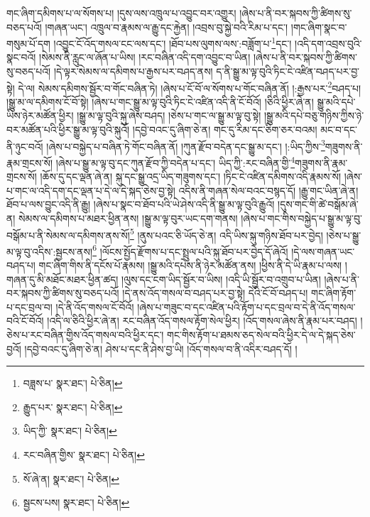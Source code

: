 གང་ཞིག་དམིགས་པ་ལ་སོགས་པ། །དུས་ལས་འཁྲུལ་པ་འབྱུང་བར་འགྱུར། །ཞེས་པ་ནི་བར་སྐབས་ཀྱི་ཚིགས་སུ་བཅད་པའོ། །གཞན་ཡང་། འཁྲུལ་བ་རྣམས་ལ་རྒྱུ་དང་རྐྱེན། །འབྲས་བུ་སྐྱེ་བའི་རིམ་པ་དང་། །གང་ཞིག་སྣང་བ་གསུམ་པོ་དག །འབྱུང་ངོ་འོད་གསལ་ངང་ལས་དང་། །ཐོབ་པས་ལུགས་ལས་:བཟློག་པ་\footnote{བཟླས་པ་  སྣར་ཐང་།  པེ་ཅིན། }དང་། །འདི་དག་འབྲས་བུའི་སྣང་བའོ། །སེམས་ནི་རླུང་ལ་ཞོན་པ་ཡིས། །རང་བཞིན་འདི་དག་འབྱུང་བ་ཡིན། །ཞེས་པ་ནི་བར་སྐབས་ཀྱི་ཚིགས་སུ་བཅད་པའོ། །དེ་ལྟར་སེམས་ལ་དམིགས་པ་རྒྱས་པར་བཤད་ནས། ད་ནི་སྒྱུ་མ་ལྟ་བུའི་ཏིང་ངེ་འཛིན་བཤད་པར་བྱ་སྟེ། དེ་ལ། སེམས་དམིགས་སྦྱོར་བ་གོང་བཞིན་ཏེ། །ཞེས་པ་ངོ་བོ་ལ་སོགས་པ་གོང་བཞིན་ནོ། །:རྒྱས་པར་\footnote{རྒྱུད་པར་  སྣར་ཐང་།  པེ་ཅིན། }བཤད་པ། །སྒྱུ་མ་ལ་དམིགས་ངོ་བོ་སྟེ། །ཞེས་པ་གང་སྒྱུ་མ་ལྟ་བུའི་ཏིང་ངེ་འཛིན་འདི་ནི་ངོ་བོའོ། །ཅིའི་ཕྱིར་ཞེ་ན། སྒྱུ་མའི་དཔེ་ཡིས་ཉེར་མཚོན་ཕྱིར། །སྒྱུ་མ་ལྟ་བུའི་སྐུ་ཞེས་བཤད། །ཅེས་པ་གང་ལ་སྒྱུ་མ་ལྟ་བུ་སྟེ། །སྒྱུ་མའི་དཔེ་བཅུ་གཉིས་ཀྱིས་ཉེ་བར་མཚོན་པའི་ཕྱིར་སྒྱུ་མ་ལྟ་བུའི་སྐུའོ། །དབྱེ་བའང་དུ་ཞིག་ཅེ་ན། གང་དུ་རིམ་དང་ཅིག་ཅར་བའམ། མང་བ་དང་ནི་ཉུང་བའོ། །ཞེས་པ་བསྐྱེད་པ་བཞིན་ཏེ་གོང་བཞིན་ནོ། །ཀུན་རྫོབ་བདེན་དང་སྒྱུ་མ་དང་། །:ཡིད་ཀྱིས་\footnote{ཡིད་ཀྱི་  སྣར་ཐང་།  པེ་ཅིན། }གཟུགས་ནི་རྣམ་གྲངས་སོ། །ཞེས་པ་སྒྱུ་མ་ལྟ་བུ་དང་ཀུན་རྫོབ་ཀྱི་བདེན་པ་དང་། ཡིད་ཀྱི་:རང་བཞིན་གྱི་\footnote{རང་བཞིན་གྱིས་  སྣར་ཐང་།  པེ་ཅིན། }གཟུགས་ནི་རྣམ་གྲངས་སོ། །ཆོས་དུ་དང་ལྡན་ཞེ་ན། སྐུ་དང་སྒྱུ་འདྲ་ཡིད་གཟུགས་དང་། །ཏིང་ངེ་འཛིན་དམིགས་འདི་རྣམས་སོ། །ཞེས་པ་གང་ལ་འདི་དག་དང་ལྡན་པ་དེ་ལ་དེ་སྐད་ཅེས་བྱ་སྟེ། འདིས་ནི་གཞན་སེལ་བའང་བསྙད་དོ། །རྒྱུ་གང་ཡིན་ཞེ་ན། ཐོབ་པ་ལས་བྱུང་འདི་ནི་རྒྱུ། །ཞེས་པ་སྣང་བ་ཐོབ་པའི་ཡེ་ཤེས་འདི་ནི་སྒྱུ་མ་ལྟ་བུའི་རྒྱུའོ། །དུས་གང་གི་ཚེ་བསྒོམ་ཞེ་ན། སེམས་ལ་དམིགས་པ་མཐར་ཕྱིན་ནས། །སྒྱུ་མ་ལྟ་བུར་ཡང་དག་གནས། །ཞེས་པ་གང་གིས་བསྐྱེད་པ་སྒྱུ་མ་ལྟ་བུ་བསྒོམ་པ་ནི་སེམས་ལ་དམིགས་ནས་སོ།\footnote{སོ་ཞེ་ན།  སྣར་ཐང་།  པེ་ཅིན། } །ནུས་པའང་ཅི་ཡོད་ཅེ་ན། འདི་ཡིས་སྐུ་གཉིས་ཐོབ་པར་བྱེད། །ཅེས་པ་སྒྱུ་མ་ལྟ་བུ་འདིས་:སྦྱངས་ནས།\footnote{སྦྱངས་པས།  སྣར་ཐང་།  པེ་ཅིན། } །ལོངས་སྤྱོད་རྫོགས་པ་དང་སྤྲུལ་པའི་སྐུ་ཐོབ་པར་བྱེད་དོ་ཞེའོ། །དེ་ལས་གཞན་ཡང་བཤད་པ། གང་ཞིག་གིས་ནི་དངོས་པོ་རྣམས། །སྒྱུ་མའི་དཔེས་ནི་ཉེར་མཚོན་ནས། །ཕྱིས་ནི་དེ་ཡི་རྣམ་པ་ལས། །གཞན་དུ་མི་མཐོང་མཐར་ཕྱིན་ཚད། །ལུས་དང་ངག་ཡིད་སྦྱོར་བ་ཡིས། །འདི་ཡི་སྦྱོར་བ་འགྲུབ་པ་ཡིན། །ཞེས་པ་ནི་བར་སྐབས་ཀྱི་ཚིགས་སུ་བཅད་པའོ། །དེ་ནས་འོད་གསལ་བ་བཤད་པར་བྱ་སྟེ། དེའི་ངོ་བོ་བཤད་པ། གང་ཞིག་རྟོག་པ་དང་བྲལ་བ། །དེ་ནི་འོད་གསལ་ངོ་བོའོ། །ཞེས་པ་གཟུང་བ་དང་འཛིན་པའི་རྟོག་པ་དང་བྲལ་བ་དེ་ནི་འོད་གསལ་བའི་ངོ་བོའོ། །འདི་ལ་ཅིའི་ཕྱིར་ཞེ་ན། རང་བཞིན་འོད་གསལ་རྟོག་སེལ་ཕྱིར། །འོད་གསལ་ཞེས་ནི་རྣམ་པར་བཤད། །ཅེས་པ་རང་བཞིན་གྱིས་འོད་གསལ་བའི་ཕྱིར་དང་། གང་གིས་རྟོག་པ་ཐམས་ཅད་སེལ་བའི་ཕྱིར་དེ་ལ་དེ་སྐད་ཅེས་བྱའོ། །དབྱེ་བའང་དུ་ཞིག་ཅེ་ན། ཤེས་པ་དང་ནི་ཤེས་བྱ་ཡི། །འོད་གསལ་བ་ནི་འདིར་བཤད་དོ། །
